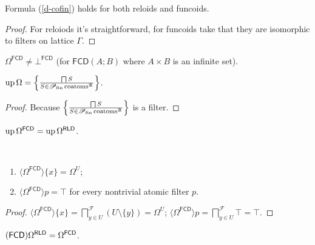 \begin{cor}
  Formula (\ref{d-cofin}) holds for both reloids and funcoids.
\end{cor}

\begin{proof}
  For reloiods it's straightforward, for funcoids take that they are
  isomorphic to filters on lattice $\Gamma$.
\end{proof}

\begin{cor}
$\Omega^{\mathsf{FCD}} \ne \bot^{\mathsf{FCD}}$ (for $\mathsf{FCD}(A;B)$ where $A\times B$ is an infinite set).
\end{cor}


\begin{prop}
  $\operatorname{up} \Omega = \left\{ \frac{ \bigsqcap S }{ S \in
  \mathscr{P}_{\operatorname{fin}} \operatorname{coatoms}^{\mathfrak{A}} }\right\}$.
\end{prop}

\begin{proof}
  Because $\left\{ \frac{ \bigsqcap S }{ S \in
  \mathscr{P}_{\operatorname{fin}} \operatorname{coatoms}^{\mathfrak{A}} }\right\}$ is a
  filter.
\end{proof}

\begin{cor}
  $\operatorname{up} \Omega^{\mathsf{FCD}} = \operatorname{up}
  \Omega^{\mathsf{RLD}}$.
\end{cor}

\begin{prop}
  ~  
  \begin{enumerate}
    \item $\langle \Omega^{\mathsf{FCD}} \rangle \{ x \} = \Omega^U$;
    
    \item $\langle \Omega^{\mathsf{FCD}} \rangle p = \top$ for every
    nontrivial atomic filter $p$.
  \end{enumerate}
\end{prop}

\begin{proof}
  $\langle \Omega^{\mathsf{FCD}} \rangle \{ x \} =
  \bigsqcap^{\mathscr{F}}_{y \in U} (U \setminus \{ y \}) = \Omega^U$;
  $\langle \Omega^{\mathsf{FCD}} \rangle p = \bigsqcap^{\mathscr{F}}_{y
  \in U} \top = \top$.
\end{proof}

\begin{prop}
  $(\mathsf{FCD}) \Omega^{\mathsf{RLD}} =
  \Omega^{\mathsf{FCD}}$.
\end{prop}

